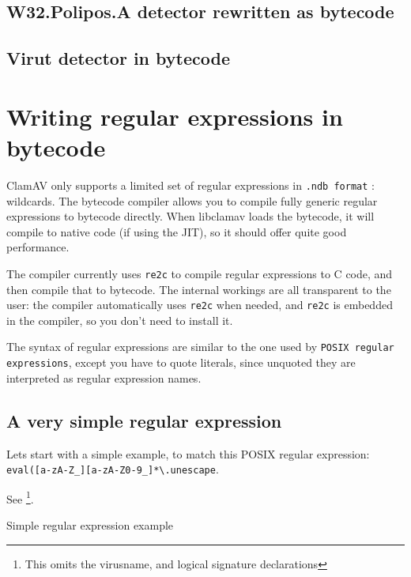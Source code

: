 \subsection{W32.Polipos.A detector rewritten as bytecode}
\subsection{Virut detector in bytecode}
\section{Writing regular expressions in bytecode} 
ClamAV only supports a limited set of regular expressions in \verb+.ndb format+ : wildcards.
The bytecode compiler allows you to compile fully generic regular expressions to bytecode directly.
When libclamav loads the bytecode, it will compile to native code (if using the JIT), so it should offer quite good performance.

The compiler currently uses \verb+re2c+ to compile regular expressions to C code, and then compile that to bytecode.
The internal workings are all transparent to the user: the compiler automatically uses \verb+re2c+ when needed, and \verb+re2c+
is embedded in the compiler, so you don't need to install it.

The syntax of regular expressions are similar to the one used by \verb+POSIX regular expressions+, except you have to quote
literals, since unquoted they are interpreted as regular expression names.

\subsection{A very simple regular expression}

Lets start with a simple example, to match this POSIX regular expression:
\verb+eval([a-zA-Z_][a-zA-Z0-9_]*\.unescape+.

See  \footnote{This omits the virusname, and logical signature declarations}.
\begin{program}

\caption{Simple regular expression example}
 \label{prg:reg1}
\end{program}

